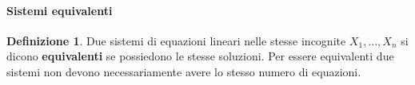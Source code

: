 \documentclass{article}
\theoremstyle{plain}
\theoremstyle{definition}
\newtheorem{defn}{Definizione}[section]
\theoremstyle{remark}
\begin{document}
\vspace{10pt}

\paragraph{Sistemi equivalenti}
\begin{bxthm}
\begin{defn}
    Due sistemi di equazioni lineari nelle stesse incognite \( X_1, \ldots, X_n \) si dicono \textbf{equivalenti} se possiedono le stesse soluzioni. 
    Per essere equivalenti due sistemi non devono necessariamente avere lo stesso numero di equazioni.
\end{defn}
\end{bxthm}

\vspace{10pt}
\end{document}
